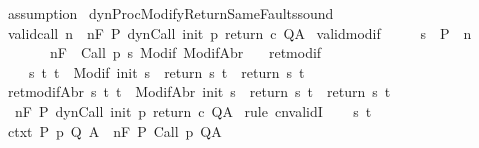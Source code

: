 \begin{isabellebody}
\isamarkupfalse%
\ assumption\isanewline
{}\isamarkupfalse%
%
\endisatagproof
{\isafoldproof}%
%
\isadelimproof
\isanewline
%
\endisadelimproof
\isanewline
{}\isamarkupfalse%
\ dynProcModifyReturnSameFaults{\isacharunderscore}sound{\isacharcolon}\isanewline
{}\ valid{\isacharunderscore}call{\isacharcolon}\ {\isachardoublequoteopen}{\isasymAnd}n{\isachardot}\ {\isasymGamma}{\isacharcomma}{\isasymTheta}\ {\isasymTurnstile}n{\isacharcolon}\isactrlbsub {\isacharslash}F\isactrlesub \ P\ dynCall\ init\ p\ return{\isacharprime}\ c\ Q{\isacharcomma}A{\isachardoublequoteclose}\isanewline
{}\ valid{\isacharunderscore}modif{\isacharcolon}\ \isanewline
\ \ \ \ {\isachardoublequoteopen}{\isasymforall}s\ {\isasymin}\ P{\isachardot}\ {\isasymforall}{\isasymsigma}{\isachardot}\ {\isasymforall}n{\isachardot}\ \isanewline
\ \ \ \ \ \ \ {\isasymGamma}{\isacharcomma}{\isasymTheta}{\isasymTurnstile}n{\isacharcolon}\isactrlbsub {\isacharslash}F\isactrlesub \ {\isacharbraceleft}{\isasymsigma}{\isacharbraceright}\ Call\ {\isacharparenleft}p\ s{\isacharparenright}\ {\isacharparenleft}Modif\ {\isasymsigma}{\isacharparenright}{\isacharcomma}{\isacharparenleft}ModifAbr\ {\isasymsigma}{\isacharparenright}{\isachardoublequoteclose}\ \isanewline
{}\ ret{\isacharunderscore}modif{\isacharcolon}\isanewline
\ \ \ \ {\isachardoublequoteopen}{\isasymforall}s\ t{\isachardot}\ t\ {\isasymin}\ Modif\ {\isacharparenleft}init\ s{\isacharparenright}\ {\isasymlongrightarrow}\ return{\isacharprime}\ s\ t\ {\isacharequal}\ return\ s\ t{\isachardoublequoteclose}\isanewline
{}\ ret{\isacharunderscore}modifAbr{\isacharcolon}\ {\isachardoublequoteopen}{\isasymforall}s\ t{\isachardot}\ t\ {\isasymin}\ ModifAbr\ {\isacharparenleft}init\ s{\isacharparenright}\ {\isasymlongrightarrow}\ return{\isacharprime}\ s\ t\ {\isacharequal}\ return\ s\ t{\isachardoublequoteclose}\isanewline
{}\ {\isachardoublequoteopen}{\isasymGamma}{\isacharcomma}{\isasymTheta}\ {\isasymTurnstile}n{\isacharcolon}\isactrlbsub {\isacharslash}F\isactrlesub \ P\ {\isacharparenleft}dynCall\ init\ p\ return\ c{\isacharparenright}\ Q{\isacharcomma}A{\isachardoublequoteclose}\isanewline
%
\isadelimproof
%
\endisadelimproof
%
\isatagproof
{}\isamarkupfalse%
\ {\isacharparenleft}rule\ cnvalidI{\isacharparenright}\isanewline
\ \ \isamarkupfalse%
\ s\ t\isanewline
\ \ \isamarkupfalse%
\ ctxt{\isacharcolon}\ {\isachardoublequoteopen}{\isasymforall}{\isacharparenleft}P{\isacharcomma}\ p{\isacharcomma}\ Q{\isacharcomma}\ A{\isacharparenright}{\isasymin}{\isasymTheta}{\isachardot}\ {\isasymGamma}\ {\isasymTurnstile}n{\isacharcolon}\isactrlbsub {\isacharslash}F\isactrlesub \ P\ {\isacharparenleft}Call\ p{\isacharparenright}\ Q{\isacharcomma}A{\isachardoublequoteclose}\isanewline

\end{isabellebody}
